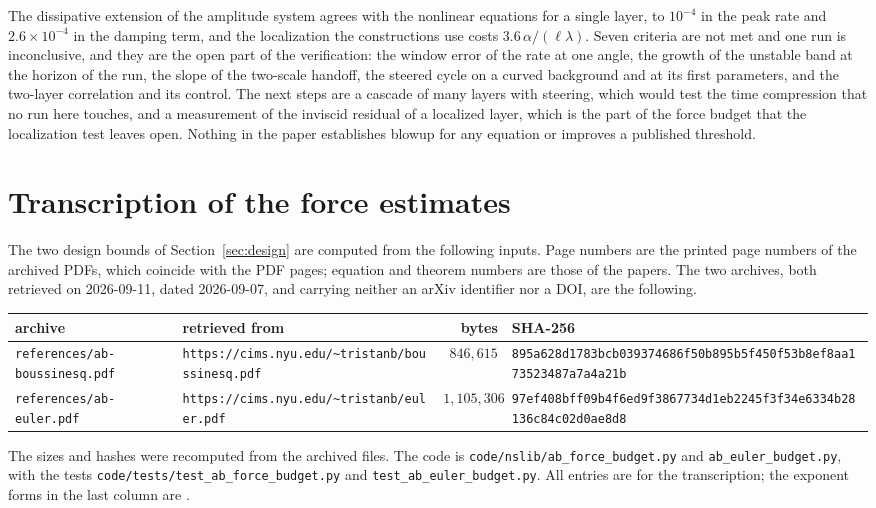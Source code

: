 \documentclass[11pt]{article}
\theoremstyle{remark}
\newcommand{\ev}[1]{\hspace{0.2em}{\small\textsf{[#1]}}}
\newcommand{\fp}[1]{\nolinkurl{#1}}
\begin{document}
The dissipative extension of the amplitude system agrees with the nonlinear equations for a single layer, to $10^{-4}$ in the
peak rate and $2.6\times10^{-4}$ in the damping term, and the localization the constructions use costs
$3.6\,\alpha/(\ell\lambda)$. Seven criteria are not met and one run is inconclusive, and they are the open part of the
verification: the window error of the rate at one angle, the growth of the unstable band at the horizon of the run, the
slope of the two-scale handoff, the steered cycle on a curved background and at its first parameters, and the two-layer
correlation and its control. The next steps are a cascade of many layers with steering, which would test the time
compression that no run here touches, and a measurement of the inviscid residual of a localized layer, which is the part of
the force budget that the localization test leaves open. Nothing in the paper establishes blowup for any equation or improves
a published threshold.


\appendix
\section{Transcription of the force estimates}\label{app:force}

The two design bounds of Section~\ref{sec:design} are computed from the following inputs. Page numbers are
the printed page numbers of the archived PDFs, which coincide with the PDF pages; equation and
theorem numbers are those of the papers. The two archives, both retrieved on 2026-09-11, dated
2026-09-07, and carrying neither an arXiv identifier nor a DOI, are the following.
\begin{center}\footnotesize
\setlength{\tabcolsep}{3pt}
\begin{tabular}{@{}L{3.1cm}L{4.6cm}r L{5.6cm}@{}}
\toprule
archive & retrieved from & bytes & SHA-256 \\
\midrule
\fp{references/ab-boussinesq.pdf} & \fp{https://cims.nyu.edu/~tristanb/boussinesq.pdf} & $846{,}615$ &
\texttt{895a628d1783bcb039374686f50b895b}\allowbreak\texttt{5f450f53b8ef8aa173523487a7a4a21b}\\
\fp{references/ab-euler.pdf} & \fp{https://cims.nyu.edu/~tristanb/euler.pdf} & $1{,}105{,}306$ &
\texttt{97ef408bff09b4f6ed9f3867734d1eb2}\allowbreak\texttt{245f3f34e6334b28136c84c02d0ae8d8}\\
\bottomrule
\end{tabular}
\end{center}
The sizes and hashes were recomputed from the archived files. The code is \fp{code/nslib/ab_force_budget.py}
and \fp{ab_euler_budget.py}, with the tests \fp{code/tests/test_ab_force_budget.py} and
\fp{test_ab_euler_budget.py}. All entries are \ev{V} for the transcription; the exponent forms in the
last column are \ev{D}.
\end{document}

